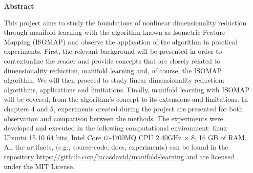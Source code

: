 \begin{center}
	\textbf{Abstract}
\end{center}

This project aims to study the foundations of nonlinear dimensionality reduction through manifold learning with the algorithm known as Isometric Feature Mapping (ISOMAP) and observe the application of the algorithm in practical experiments. First, the relevant background will be presented in order to contextualize the reader and provide concepts that are closely related to dimensionality reduction, manifold learning and, of course, the ISOMAP algorithm. We will then proceed to study linear dimensionality reduction: algorithms, applications and limitations. Finally, manifold learning with ISOMAP will be covered, from the algorithm's concept to its extensions and limitations. In chapters 4 and 5, experiments created during the project are presented for both observation and comparison between the methods. The experiments were developed and executed in the following computational environment: linux Ubuntu 15.10 64 bits, Intel Core i7-4700MQ CPU 2.40GHz $\times$ 8, 16 GB of RAM. All the artifacts, (e.g., source-code, docs, experiments) can be found in the repository \url{https://github.com/lucasdavid/manifold-learning} and are licensed under the MIT License.

\afterpage{\blankpage}

